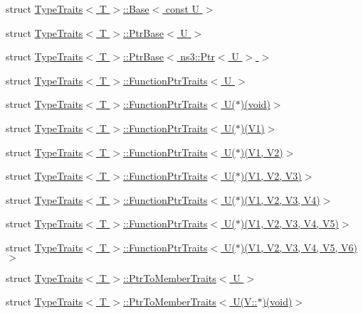 \begin{DoxyCompactItemize}
\item 
struct \hyperlink{structTypeTraits_1_1Base_3_01const_01U_01_4}{Type\+Traits$<$ T $>$\+::\+Base$<$ const U $>$}
\item 
struct \hyperlink{structTypeTraits_1_1PtrBase}{Type\+Traits$<$ T $>$\+::\+Ptr\+Base$<$ U $>$}
\item 
struct \hyperlink{structTypeTraits_1_1PtrBase_3_01ns3_1_1Ptr_3_01U_01_4_01_4}{Type\+Traits$<$ T $>$\+::\+Ptr\+Base$<$ ns3\+::\+Ptr$<$ U $>$ $>$}
\item 
struct \hyperlink{structTypeTraits_1_1FunctionPtrTraits}{Type\+Traits$<$ T $>$\+::\+Function\+Ptr\+Traits$<$ U $>$}
\item 
struct \hyperlink{structTypeTraits_1_1FunctionPtrTraits_3_01U_07_5_08_07void_08_4}{Type\+Traits$<$ T $>$\+::\+Function\+Ptr\+Traits$<$ U($\ast$)(void)$>$}
\item 
struct \hyperlink{structTypeTraits_1_1FunctionPtrTraits_3_01U_07_5_08_07V1_08_4}{Type\+Traits$<$ T $>$\+::\+Function\+Ptr\+Traits$<$ U($\ast$)(\+V1)$>$}
\item 
struct \hyperlink{structTypeTraits_1_1FunctionPtrTraits_3_01U_07_5_08_07V1_00_01V2_08_4}{Type\+Traits$<$ T $>$\+::\+Function\+Ptr\+Traits$<$ U($\ast$)(\+V1, V2)$>$}
\item 
struct \hyperlink{structTypeTraits_1_1FunctionPtrTraits_3_01U_07_5_08_07V1_00_01V2_00_01V3_08_4}{Type\+Traits$<$ T $>$\+::\+Function\+Ptr\+Traits$<$ U($\ast$)(\+V1, V2, V3)$>$}
\item 
struct \hyperlink{structTypeTraits_1_1FunctionPtrTraits_3_01U_07_5_08_07V1_00_01V2_00_01V3_00_01V4_08_4}{Type\+Traits$<$ T $>$\+::\+Function\+Ptr\+Traits$<$ U($\ast$)(\+V1, V2, V3, V4)$>$}
\item 
struct \hyperlink{structTypeTraits_1_1FunctionPtrTraits_3_01U_07_5_08_07V1_00_01V2_00_01V3_00_01V4_00_01V5_08_4}{Type\+Traits$<$ T $>$\+::\+Function\+Ptr\+Traits$<$ U($\ast$)(\+V1, V2, V3, V4, V5)$>$}
\item 
struct \hyperlink{structTypeTraits_1_1FunctionPtrTraits_3_01U_07_5_08_07V1_00_01V2_00_01V3_00_01V4_00_01V5_00_01V6_08_4}{Type\+Traits$<$ T $>$\+::\+Function\+Ptr\+Traits$<$ U($\ast$)(\+V1, V2, V3, V4, V5, V6)$>$}
\item 
struct \hyperlink{structTypeTraits_1_1PtrToMemberTraits}{Type\+Traits$<$ T $>$\+::\+Ptr\+To\+Member\+Traits$<$ U $>$}
\item 
struct \hyperlink{structTypeTraits_1_1PtrToMemberTraits_3_01U_07V_1_1_5_08_07void_08_4}{Type\+Traits$<$ T $>$\+::\+Ptr\+To\+Member\+Traits$<$ U(\+V\+::$\ast$)(void)$>$}

\end{DoxyCompactItemize}
